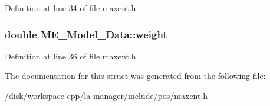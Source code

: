 Definition at line 34 of file maxent.h.\hypertarget{structME__Model__Data_d93cb18e1b315dfaca1613886a789781}{
\subsubsection[{weight}]{\setlength{\rightskip}{0pt plus 5cm}double {\bf ME\_\-Model\_\-Data::weight}}}
\label{structME__Model__Data_d93cb18e1b315dfaca1613886a789781}




Definition at line 36 of file maxent.h.

The documentation for this struct was generated from the following file:\begin{CompactItemize}
\item 
/disk/workspace-cpp/la-manager/include/pos/\hyperlink{maxent_8h}{maxent.h}\end{CompactItemize}
